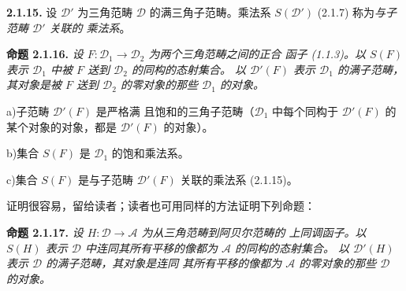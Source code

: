 \clearpage
{}%
\begingroup
\small
\setlength{\emergencystretch}{1.5em}%
\setlength{\abovedisplayskip}{1pt plus 1pt minus 1pt}%
\setlength{\belowdisplayskip}{1pt plus 1pt minus 1pt}%

\noindent\textbf{2.1.15.}\quad
{}%
设 $\mathcal D'$ 为三角范畴 $\mathcal D$ 的满三角子范畴。乘法系
$S(\mathcal D')$ (2.1.7) 称为\emph{与子范畴 $\mathcal D'$ 关联的
乘法系}。

\smallskip
\noindent\textbf{命题 2.1.16.}\quad
\begingroup\itshape
{}%
设 $F\colon\mathcal D_1\to\mathcal D_2$ 为两个三角范畴之间的正合
函子 (1.1.3)。以 $S(F)$ 表示 $\mathcal D_1$ 中被 $F$ 送到
$\mathcal D_2$ 的同构的态射集合。
%
以 $\mathcal D'(F)$ 表示 $\mathcal D_1$ 的满子范畴，其对象是被
$F$ 送到 $\mathcal D_2$ 的零对象的那些 $\mathcal D_1$ 的对象。

\par\noindent\hspace*{2em}a)\enspace 子范畴 $\mathcal D'(F)$ 是严格满
且饱和的三角子范畴（$\mathcal D_1$ 中每个同构于 $\mathcal D'(F)$
的某个对象的对象，都是 $\mathcal D'(F)$ 的对象）。

\par\noindent\hspace*{2em}b)\enspace 集合 $S(F)$ 是 $\mathcal D_1$
的饱和乘法系。

\par\noindent\hspace*{2em}c)\enspace 集合 $S(F)$ 是与子范畴
$\mathcal D'(F)$ 关联的乘法系 (2.1.15)。
\par\endgroup

\noindent 证明很容易，留给读者；读者也可用同样的方法证明下列命题：

\smallskip
\noindent\textbf{命题 2.1.17.}\quad
\begingroup\itshape
{}%
设 $H\colon\mathcal D\to\mathcal A$ 为从三角范畴到阿贝尔范畴的
上同调函子。以 $S(H)$ 表示 $\mathcal D$ 中连同其所有平移的像都为
$\mathcal A$ 的同构的态射集合。
%
以 $\mathcal D'(H)$ 表示 $\mathcal D$ 的满子范畴，其对象是连同
其所有平移的像都为 $\mathcal A$ 的零对象的那些
$\mathcal D$ 的对象。

